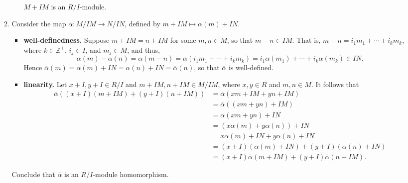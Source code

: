 \documentclass[9pt]{article}
\newcommand{\Z}{\mathbb{Z}}
\begin{document}
\begin{enumerate}
\begin{enumerate}
\begin{itemize}
                  $M+IM$ is an $R/I$-module.
               \end{itemize}
         \item Consider the map $\overline{\alpha} : M/IM \rightarrow N/IN$,
               defined by $m + IM \mapsto \alpha(m) + IN$.
               \begin{itemize}
                  \item \textbf{well-definedness.} Suppose $m + IM = n + IM$ for
                        some $m, n \in M$, so that $m - n \in IM$. That is,
                        $m - n = i_1m_1 + \cdots + i_km_k$, where $k \in \Z^+$,
                        $i_j \in I$, and $m_j \in M$, and thus,
                        $$\alpha(m) - \alpha(n) = \alpha(m - n)=
                          \alpha(i_1m_1 + \cdots + i_km_k)=
                          i_1\alpha(m_1) + \cdots + i_k\alpha(m_k) \in IN.$$
                        Hence $\overline{\alpha}(m) = \alpha(m) + IN =
                        \alpha(n) + IN = \overline{\alpha}(n)$, so that
                        $\overline{\alpha}$ is well-defined.
                  \item \textbf{linearity.} Let $x + I, y + I \in R/I$ and
                        $m + IM, n + IM \in M/IM$, where $x, y \in R$ and
                        $m, n \in M$. It follows that
                        \begin{align*}
                           \overline{\alpha}((x+I)(m+IM) + (y+I)(n+IM)) &=
                              \overline{\alpha}(xm+IM +yn+IM) \\
                              &= \overline{\alpha}((xm+yn)+IM) \\
                              &= \alpha(xm+yn)+IN \\
                              &= (x\alpha(m)+y\alpha(n)) + IN \\
                              &= x\alpha(m) + IN + y\alpha(n) + IN \\
                              &= (x+I)(\alpha(m) + IN)+(y+I)(\alpha(n) + IN) \\
                              &= (x+I)\overline{\alpha}(m+IM)+(y+I)\overline{\alpha}(n+IM).
                        \end{align*}
               \end{itemize}
               Conclude that $\overline{\alpha}$ is an $R/I$-module
               homomorphism.
      \end{enumerate}

\end{enumerate}
\end{document}
